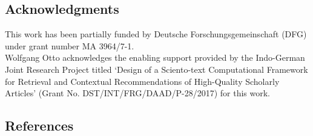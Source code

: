 \subsection{Acknowledgments} 
This work has been partially funded by Deutsche Forschungsgemeinschaft (DFG) under grant number MA 3964/7-1. \\
Wolfgang Otto acknowledges the enabling support provided by the Indo-German Joint Research
Project titled ‘Design of a Sciento-text Computational Framework for Retrieval and
Contextual Recommendations of High-Quality Scholarly Articles’ (Grant No.
DST/INT/FRG/DAAD/P-28/2017) for this work. 
\subsection{References} 


